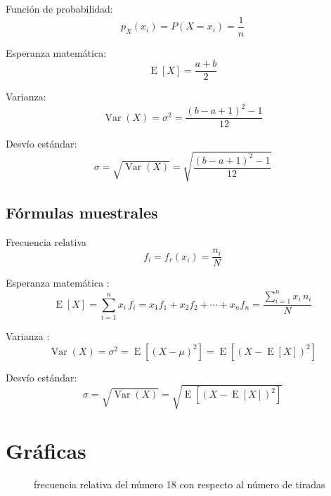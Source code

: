 \documentclass{article}
\begin{document}
Función de probabilidad:
\begin{equation}
p_X(x_i) = P(X = x_i) = \frac{1}{n}
\end{equation}

Esperanza matemática:
\begin{equation}
\operatorname{E}[X] = \frac{a+b}{2}
\end{equation}

Varianza:
\begin{equation}
\operatorname{Var}(X) = \sigma^{2} = \frac{(b-a+1)^{2}-1}{12}
\end{equation}

Desvío estándar:
\begin{equation}
\sigma = \sqrt{\operatorname{Var}(X)} = \sqrt{\frac{(b-a+1)^{2}-1}{12}}
\end{equation}

\subsection{Fórmulas muestrales}
Frecuencia relativa \cite{wiki-frecuencia}
\begin{equation}
f_{i} = f_{r}(x_{i}) = \frac {n_{i}}{N}
\end{equation}

Esperanza matemática \cite{wiki-esperanza}:
\begin{equation}
\operatorname{E}[X] = \sum_{i=1}^{n}x_{i}\,f_{i}=x_{1}f_{1}+x_{2}f_{2}+\cdots +x_{n}f_{n} = \frac{\sum_{i=1}^{n}x_{i}\,n_{i}}{N}
\end{equation}

Varianza \cite{wiki-varianza}:
\begin{equation}
\operatorname{Var}(X) = \sigma^{2} = \operatorname{E}\left[(X - \mu)^{2}\right] = \operatorname{E}\left[(X - \operatorname{E}[X])^{2}\right]
\end{equation}

Desvío estándar:
\begin{equation}
\sigma = \sqrt{\operatorname{Var}(X)} = \sqrt{\operatorname{E}\left[(X - \operatorname{E}[X])^{2}\right]}
\end{equation}

\section{Gráficas}
\begin{figure}[H]
  \begin{mytikzresize}{0.8\textwidth}
    \centering
    
    \caption{frecuencia relativa del número 18 con respecto al número de tiradas}
  \end{mytikzresize}
\end{figure}
\end{document}
